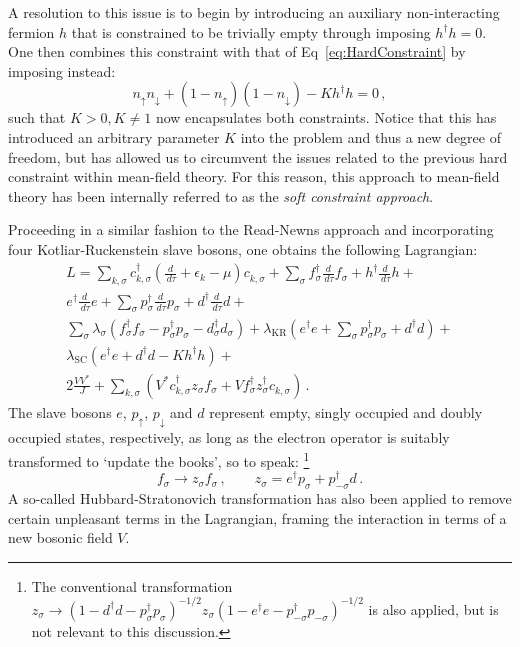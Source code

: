 \documentclass[12pt]{article}
\begin{document}
A resolution to this issue is to begin by introducing an auxiliary non-interacting fermion $ h $ that is constrained to be trivially empty through imposing $ h^{\dagger} h = 0 $. One then combines this constraint with that of Eq~\eqref{eq:HardConstraint} by imposing instead: \begin{equation} n_{\uparrow} n_{\downarrow} + (1 - n_{\uparrow})(1 - n_{\downarrow}) - K h^{\dagger} h = 0\,, \end{equation} such that $ K > 0, K \neq 1 $ now encapsulates both constraints. Notice that this has introduced an arbitrary parameter $ K $ into the problem and thus a new degree of freedom, but has allowed us to circumvent the issues related to the previous hard constraint within mean-field theory. For this reason, this approach to mean-field theory has been internally referred to as the \emph{soft constraint approach}.

Proceeding in a similar fashion to the Read-Newns approach and incorporating four Kotliar-Ruckenstein \cite{KotliarRuckenstein} slave bosons, one obtains the following Lagrangian: \begin{eqnarray} L = \sum_{k,\sigma} c^{\dagger}_{k,\sigma} \left( \frac{d}{\,d\tau} + \epsilon_k - \mu \right) c^{}_{k,\sigma} + \sum_{\sigma} f^{\dagger}_{\sigma} \frac{d}{\,d\tau} f^{}_{\sigma} + h^{\dagger} \frac{d}{\,d\tau}h + \\
e^{\dagger} \frac{d}{\,d\tau} e  + \sum_{\sigma} p^{\dagger}_{\sigma} \frac{d}{\,d\tau} p^{}_{\sigma} + d^{\dagger} \frac{d}{\,d\tau} d + \\
\sum_{\sigma} \lambda^{}_{\sigma} (f^{\dagger}_{\sigma} f^{}_{\sigma} - p^{\dagger}_{\sigma} p^{}_{\sigma} - d^{\dagger}_{\sigma} d^{}_\sigma ) + \lambda_{\text{KR}} \left( e^{\dagger} e + \sum_{\sigma} p^{\dagger}_{\sigma} p^{}_{\sigma} + d^{\dagger} d \right) + \\
\lambda_{\text{SC}} ( e^{\dagger} e + d^{\dagger} d - K h^{\dagger} h) + \\
2 \frac{V V^{\ast}}{J} + \sum_{k,\sigma} \left( V^{\ast} c^{\dagger}_{k,\sigma} z^{}_{\sigma} f^{}_{\sigma} + V f^{\dagger}_{\sigma} z^{\dagger}_{\sigma} c^{}_{k,\sigma} \right) \,. \end{eqnarray} The slave bosons $ e $, $ p_{\uparrow} $, $ p_{\downarrow} $ and $ d $ represent empty, singly occupied and doubly occupied states, respectively, as long as the electron operator is suitably transformed to `update the books', so to speak: \footnote{The conventional transformation $ z^{}_{\sigma} \rightarrow (1 - d^{\dagger} d - p^{\dagger}_{\sigma} p^{}_{\sigma})^{- 1 / 2} z^{}_{\sigma} (1 - e^{\dagger} e - p^{\dagger}_{- \sigma} p^{}_{- \sigma})^{- 1 / 2} $ is also applied, but is not relevant to this discussion.} \begin{equation} f^{}_{\sigma} \rightarrow z^{}_{\sigma} f^{}_{\sigma}\,, \qquad z_{\sigma} = e^{\dagger} p^{}_{\sigma} + p^{\dagger}_{-\sigma} d \,. \end{equation} A so-called Hubbard-Stratonovich transformation has also been applied to remove certain unpleasant terms in the Lagrangian, framing the interaction in terms of a new bosonic field $ V $.
\end{document}
